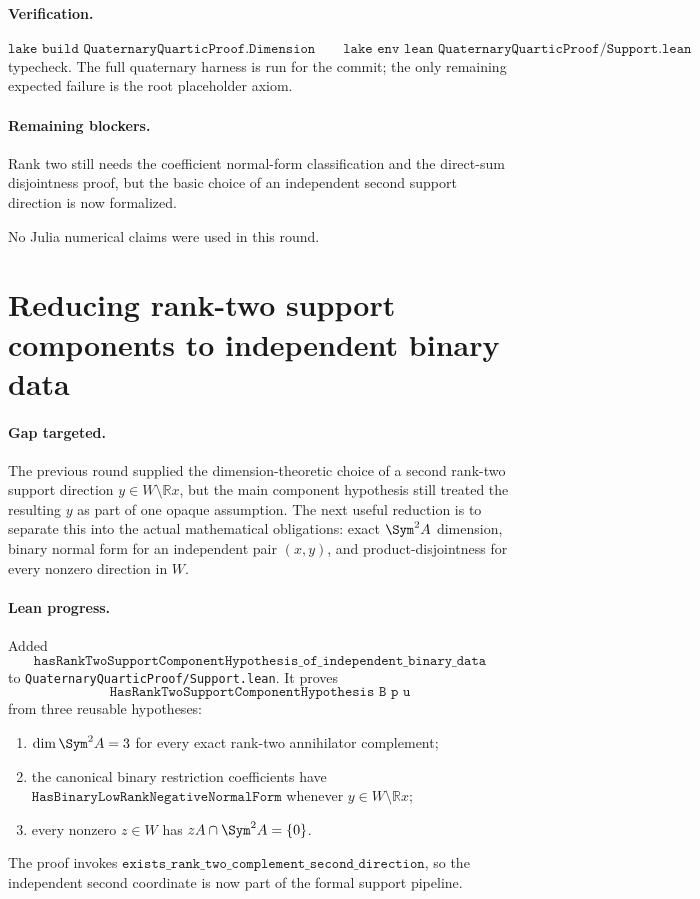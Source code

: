 \documentclass[11pt]{article}
\begin{document}
\paragraph{Verification.}
\[
\texttt{lake build QuaternaryQuarticProof.Dimension}
\qquad
\texttt{lake env lean QuaternaryQuarticProof/Support.lean}
\]
typecheck.  The full quaternary harness is run for the commit; the only
remaining expected failure is the root placeholder axiom.

\paragraph{Remaining blockers.}
Rank two still needs the coefficient normal-form classification and the
direct-sum disjointness proof, but the basic choice of an independent second
support direction is now formalized.

No Julia numerical claims were used in this round.

\section*{Reducing rank-two support components to independent binary data}

\paragraph{Gap targeted.}
The previous round supplied the dimension-theoretic choice of a second
rank-two support direction \(y\in W\setminus \mathbb{R}x\), but the main
component hypothesis still treated the resulting \(y\) as part of one opaque
assumption.  The next useful reduction is to separate this into the actual
mathematical obligations: exact \(\Sym^2 A\) dimension, binary normal form for
an independent pair \((x,y)\), and product-disjointness for every nonzero
direction in \(W\).

\paragraph{Lean progress.}
Added
\[
\texttt{hasRankTwoSupportComponentHypothesis\_of\_independent\_binary\_data}
\]
to \texttt{QuaternaryQuarticProof/Support.lean}.  It proves
\[
\texttt{HasRankTwoSupportComponentHypothesis B p u}
\]
from three reusable hypotheses:
\begin{enumerate}
\item \(\dim \Sym^2 A=3\) for every exact rank-two annihilator complement;
\item the canonical binary restriction coefficients have
  \(\texttt{HasBinaryLowRankNegativeNormalForm}\) whenever
  \(y\in W\setminus \mathbb{R}x\);
\item every nonzero \(z\in W\) has
  \(zA\cap \Sym^2A=\{0\}\).
\end{enumerate}
The proof invokes
\(\texttt{exists\_rank\_two\_complement\_second\_direction}\), so the
independent second coordinate is now part of the formal support pipeline.
\end{document}
